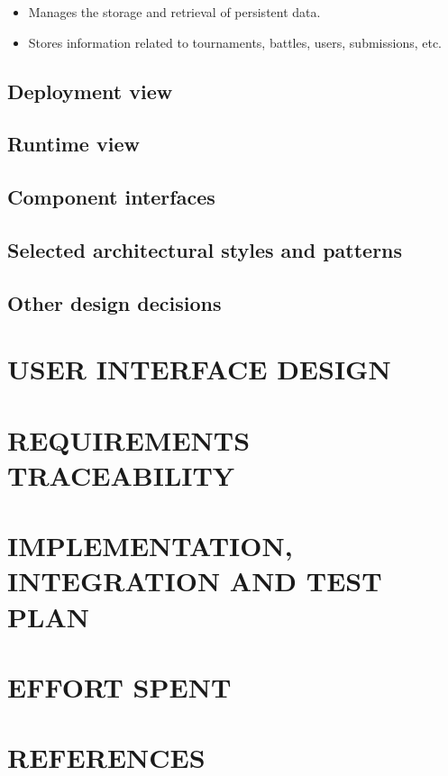 \documentclass{article}
\begin{document}
\begin{itemize}
    \item Manages the storage and retrieval of persistent data.
    \item Stores information related to tournaments, battles, users, submissions, etc.
\end{itemize}


\subsection{Deployment view}



\subsection{Runtime view}
\subsection{Component interfaces}
\subsection{Selected architectural styles and patterns}
\subsection{Other design decisions}

\section{USER INTERFACE DESIGN}

\section{REQUIREMENTS TRACEABILITY}

\section{IMPLEMENTATION, INTEGRATION AND TEST PLAN}

\section{EFFORT SPENT}

\section{REFERENCES}
\end{document}
